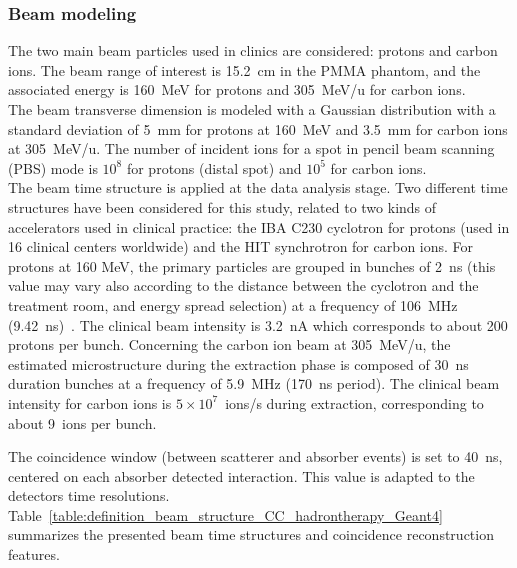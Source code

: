 \subsubsection{Beam modeling}
The two main beam particles used in clinics are considered: protons and carbon ions. The beam range of interest is 15.2~cm in the PMMA phantom, and the associated energy is 160~MeV for protons and 305~MeV/u for carbon ions.\\ 
The beam transverse dimension is modeled with a Gaussian distribution with a standard deviation of 5~mm for protons at 160~MeV and 3.5~mm for carbon ions at 305~MeV/u. The number of incident ions for a spot in pencil beam scanning (PBS) mode is $10^8$ for protons (distal spot) and $10^5$ for carbon ions.\\
The beam time structure is applied at the data analysis stage.
Two different time structures have been considered for this study, related to two kinds of accelerators used in clinical practice: the IBA C230 cyclotron for protons (used in 16 clinical centers worldwide) and the HIT synchrotron for carbon ions. For protons at 160 MeV, the primary particles are grouped in bunches of 2~ns (this value may vary also according to the distance between the cyclotron and the treatment room, and energy spread selection) at a frequency of 106~MHz (9.42~ns)~\cite{Roellinghoff_2014}. The clinical beam intensity is 3.2~nA which corresponds to about 200 protons per bunch. Concerning the carbon ion beam at 305~MeV/u, the estimated microstructure during the extraction phase is composed of 30~ns duration bunches at a frequency of 5.9~MHz (170~ns period). The clinical beam intensity for carbon ions is $5\times10^7$~ions/s during extraction, corresponding to about 9~ions per bunch. 

The coincidence window (between scatterer and absorber events) is set to 40~ns, centered on each absorber detected interaction. This value is adapted to the detectors time resolutions. Table~\ref{table:definition_beam_structure_CC_hadrontherapy_Geant4} summarizes the presented beam time structures and coincidence reconstruction features.

